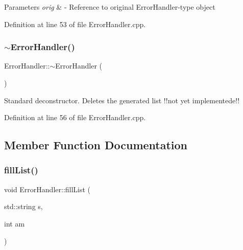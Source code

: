 \begin{DoxyParams}{Parameters}
{\em orig} & -\/ Reference to original Error\+Handler-\/type object \\
\hline
\end{DoxyParams}


Definition at line 53 of file Error\+Handler.\+cpp.

\mbox{\label{classErrorHandler_a73c7e690b864697e507aaeb537b3c3e5}} 
\subsubsection{\texorpdfstring{$\sim$ErrorHandler()}{~ErrorHandler()}}
{\footnotesize\ttfamily Error\+Handler\+::$\sim$\+Error\+Handler (\begin{DoxyParamCaption}{ }\end{DoxyParamCaption})\hspace{0.3cm}{\ttfamily [virtual]}}

Standard deconstructor. Deletes the generated list !!not yet implementede!! 

Definition at line 56 of file Error\+Handler.\+cpp.



\subsection{Member Function Documentation}
\mbox{\label{classErrorHandler_a3036b8ff4299ac0505b6b2ca6fab11a1}} 
\subsubsection{\texorpdfstring{fillList()}{fillList()}\hspace{0.1cm}{\footnotesize\ttfamily [1/2]}}
{\footnotesize\ttfamily void Error\+Handler\+::fill\+List (\begin{DoxyParamCaption}\item[{std\+::string}]{s,  }\item[{int}]{am }\end{DoxyParamCaption})\hspace{0.3cm}{\ttfamily [private]}}



